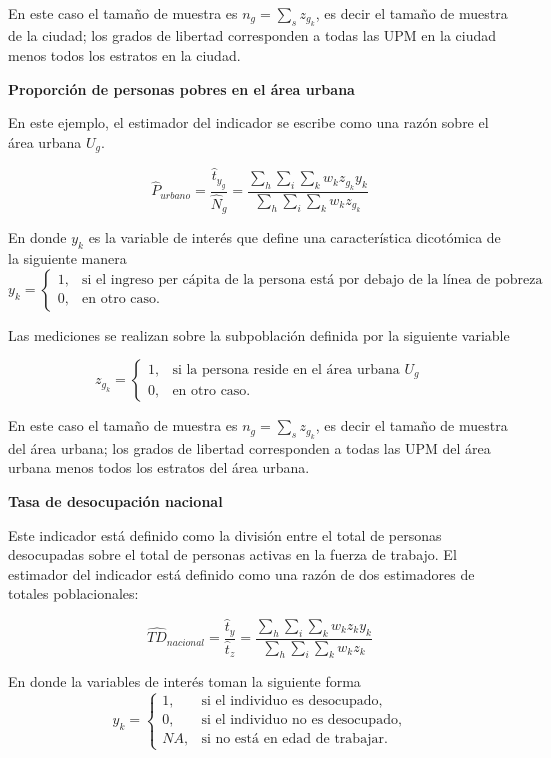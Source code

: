\documentclass[
  12pt,
  spanish,
]{book}
\begin{document}
En este caso el tamaño de muestra es \(n_g = \sum_s z_{g_k}\), es decir el tamaño de muestra de la ciudad; los grados de libertad corresponden a todas las UPM en la ciudad menos todos los estratos en la ciudad.

\textbf{Proporción de personas pobres en el área urbana}

En este ejemplo, el estimador del indicador se escribe como una razón sobre el área urbana \(U_g\).

\[
\hat{P}_{urbano} = \frac{\hat t_{y_g}}{\hat N_g} =\frac{\sum_h\sum_i\sum_k w_kz_{g_k}y_{k}}{\sum_h\sum_i\sum_k w_kz_{g_k}}
\]

En donde \(y_{k}\) es la variable de interés que define una característica dicotómica de la siguiente manera
\[
y_k=
\begin{cases}
1, &\text{si el ingreso per cápita de la persona está por debajo de la línea de pobreza}\\
0, &\text{en otro caso.}
\end{cases}
\]

Las mediciones se realizan sobre la subpoblación definida por la siguiente variable

\[
z_{g_k}=
\begin{cases}
1, &\text{si la persona reside en el área urbana $U_g$}\\
0, &\text{en otro caso.}
\end{cases}
\]

En este caso el tamaño de muestra es \(n_g = \sum_s z_{g_k}\), es decir el tamaño de muestra del área urbana; los grados de libertad corresponden a todas las UPM del área urbana menos todos los estratos del área urbana.

\textbf{Tasa de desocupación nacional}

Este indicador está definido como la división entre el total de personas desocupadas sobre el total de personas activas en la fuerza de trabajo. El estimador del indicador está definido como una razón de dos estimadores de totales poblacionales:

\[
\widehat{TD}_{nacional} =  \frac{\hat t_y}{\hat t_z} =\frac{\sum_h\sum_i\sum_k w_kz_{k}y_{k}}{\sum_h\sum_i\sum_k w_kz_{k}}
\]

En donde la variables de interés toman la siguiente forma
\[
y_{k}=
\begin{cases}
1, &\text{si el individuo es desocupado,}\\
0, &\text{si el individuo no es desocupado,}\\
NA, &\text{si no está en edad de trabajar.}
\end{cases}
\]
\end{document}
